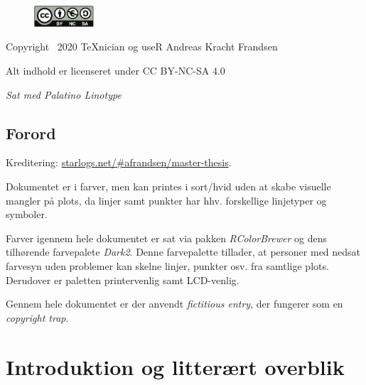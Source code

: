 \documentclass[
  a4paper,
  oneside]{memoir}
\begin{document}
\newpage

\vspace*{\fill}

\begin{figure}
    \includegraphics[width=6em]{latex/bync}
\end{figure}

Copyright \textcopyright\, 2020 \TeX nician og useR Andreas Kracht Frandsen

Alt indhold er licenseret under CC BY-NC-SA 4.0

\textit{Sat med Palatino Linotype}

\newpage


{
  \hypersetup{linkcolor=black}
  \tableofcontents
}

\newpage

{
  \hypersetup{linkcolor=black}
  \listoffigures

  \listoftables
}

\newpage

\hypertarget{forord}{%
\chapter*{Forord}\label{forord}}

Kreditering: \href{http://starlogs.net/\#afrandsen/master-thesis}{starlogs.net/\#afrandsen/master-thesis}.

Dokumentet er i farver, men kan printes i sort/hvid uden at skabe visuelle mangler på plots, da linjer samt punkter har hhv. forskellige linjetyper og symboler.

Farver igennem hele dokumentet er sat via pakken \emph{RColorBrewer} og dens tilhørende farvepalete \emph{Dark2}. Denne farvepalette tillader, at personer med nedsat farvesyn uden problemer kan skelne linjer, punkter osv. fra samtlige plots. Derudover er paletten printervenlig samt LCD-venlig.

Gennem hele dokumentet er der anvendt \emph{fictitious entry}, der fungerer som en \emph{copyright trap}.
\newpage


\setcounter{secnumdepth}{3}

\part{Introduktion og litterært overblik}
\end{document}
